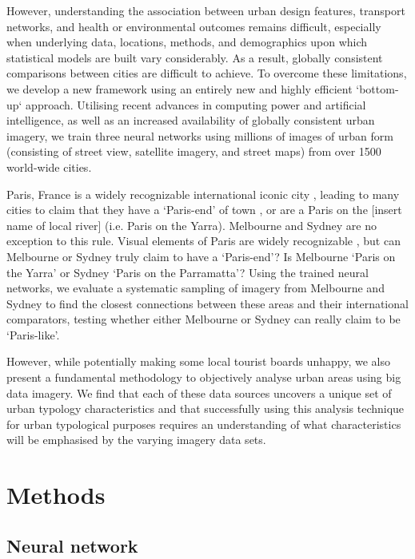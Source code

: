 \documentclass[10pt,letterpaper]{article}
\begin{document}
However, understanding the association between urban design features, transport networks, and health or environmental outcomes remains difficult, especially when underlying data, locations, methods, and demographics upon which statistical models are built vary considerably. As a result, globally consistent comparisons between cities are difficult to achieve. To overcome these limitations, we develop a new framework using an entirely new and highly efficient `bottom-up` approach. Utilising recent advances in computing power and artificial intelligence, as well as an increased availability of globally consistent urban imagery, we train three neural networks using millions of images of urban form (consisting of street view, satellite imagery, and street maps) from over 1500 world-wide cities. 

Paris, France is a widely recognizable international iconic city \cite{Anholt2006}, leading to many cities to claim that they have a `Paris-end' of town \cite{Williams2010}, or are a Paris on the [insert name of local river] \cite{Wilden2013} (i.e. Paris on the Yarra). Melbourne and Sydney are no exception to this rule. Visual elements of Paris are widely recognizable \cite{Doersch2012}, but can Melbourne or Sydney truly claim to have a `Paris-end'? Is Melbourne `Paris on the Yarra' or Sydney `Paris on the Parramatta'? Using the trained neural networks, we evaluate a systematic sampling of imagery from Melbourne and Sydney to find the closest connections between these areas and their international comparators, testing whether either Melbourne or Sydney can really claim to be `Paris-like'.

However, while potentially making some local tourist boards unhappy, we also present a fundamental methodology to objectively analyse urban areas using big data imagery. We find that each of these data sources uncovers a unique set of urban typology characteristics and that successfully using this analysis technique for urban typological purposes requires an understanding of what characteristics will be emphasised by the varying imagery data sets.

\section*{Methods}\label{sec:methods}
\subsection*{Neural network}\label{sec:methods1}
\end{document}
